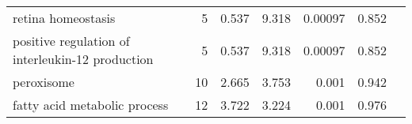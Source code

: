 \begin{longtable}{|l|r|r|r|r|r|}
                                retina homeostasis &                       5 &                   0.537 &      9.318 &              0.00097 &                       0.852~~ \\
  positive regulation of interleukin-12 production &                       5 &                   0.537 &      9.318 &              0.00097 &                       0.852~~ \\
                                        peroxisome &                      10 &                   2.665 &      3.753 &                0.001 &                       0.942~~ \\
                      fatty acid metabolic process &                      12 &                   3.722 &      3.224 &                0.001 &                       0.976~~ \\
\end{longtable}
